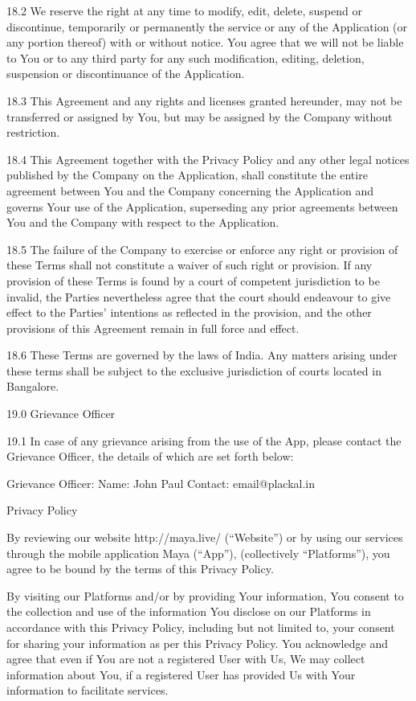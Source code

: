 18.2      We reserve the right at any time to modify, edit, delete, suspend or discontinue, temporarily or permanently the service or any of the Application (or any portion thereof) with or without notice. You agree that we will not be liable to You or to any third party for any such modification, editing, deletion, suspension or discontinuance of the Application.

18.3      This Agreement and any rights and licenses granted hereunder, may not be transferred or assigned by You, but may be assigned by the Company without restriction.

18.4      This Agreement together with the Privacy Policy and any other legal notices published by the Company on the Application, shall constitute the entire agreement between You and the Company concerning the Application and governs Your use of the Application, superseding any prior agreements between You and the Company with respect to the Application.

18.5      The failure of the Company to exercise or enforce any right or provision of these Terms shall not constitute a waiver of such right or provision. If any provision of these Terms is found by a court of competent jurisdiction to be invalid, the Parties nevertheless agree that the court should endeavour to give effect to the Parties’ intentions as reflected in the provision, and the other provisions of this Agreement remain in full force and effect.

18.6      These Terms are governed by the laws of India. Any matters arising under these terms shall be subject to the exclusive jurisdiction of courts located in Bangalore.

 

19.0     Grievance Officer

19.1      In case of any grievance arising from the use of the App, please contact the Grievance Officer, the details of which are set forth below:

Grievance Officer: Name: John Paul  Contact: email@plackal.in

 

Privacy Policy

 

By reviewing our website http://maya.live/ (“Website”) or by using our services through the mobile application Maya (“App”), (collectively “Platforms”), you agree to be bound by the terms of this Privacy Policy.

By visiting our Platforms and/or by providing Your information, You consent to the collection and use of the information You disclose on our Platforms in accordance with this Privacy Policy, including but not limited to, your consent for sharing your information as per this Privacy Policy. You acknowledge and agree that even if You are not a registered User with Us, We may collect information about You, if a registered User has provided Us with Your information to facilitate services.

